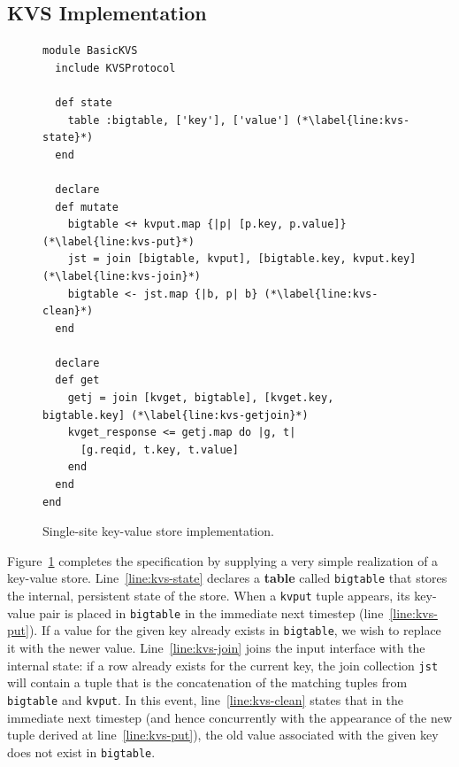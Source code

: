 \subsection{KVS Implementation}
\begin{figure}[t]
\begin{scriptsize}
\begin{lstlisting}
module BasicKVS
  include KVSProtocol

  def state
    table :bigtable, ['key'], ['value'] (*\label{line:kvs-state}*)
  end

  declare
  def mutate
    bigtable <+ kvput.map {|p| [p.key, p.value]} (*\label{line:kvs-put}*)
    jst = join [bigtable, kvput], [bigtable.key, kvput.key] (*\label{line:kvs-join}*)
    bigtable <- jst.map {|b, p| b} (*\label{line:kvs-clean}*)
  end

  declare
  def get
    getj = join [kvget, bigtable], [kvget.key, bigtable.key] (*\label{line:kvs-getjoin}*)
    kvget_response <= getj.map do |g, t|
      [g.reqid, t.key, t.value]
    end
  end
end
\end{lstlisting}
\centering
\vspace{-10pt}
\caption{Single-site key-value store implementation.}
\label{fig:kvs-impl}
\end{scriptsize}
\vspace{-2pt}
\end{figure}

Figure~\ref{fig:kvs-impl} completes the specification by supplying a very simple
realization of a key-value store.  Line~\ref{line:kvs-state} declares a \textbf{table}
called \texttt{bigtable} that stores the internal, persistent state of the store.
When a \texttt{kvput} tuple appears, its key-value pair is placed in \texttt{bigtable} in the
immediate next timestep (line~\ref{line:kvs-put}).  If a value for the given key already 
exists in \texttt{bigtable}, we wish to replace it with the newer value.  Line~\ref{line:kvs-join}
joins the input interface with the internal state: if a row already exists for the current key,  
the join collection \texttt{jst} will contain a tuple that is the concatenation of the matching
tuples from \texttt{bigtable} and \texttt{kvput}.  In this event, line~\ref{line:kvs-clean}
states that in the immediate next timestep (and hence concurrently with the appearance of the
new tuple derived at line~\ref{line:kvs-put}), the old value associated with the given key
does not exist in \texttt{bigtable}.  


